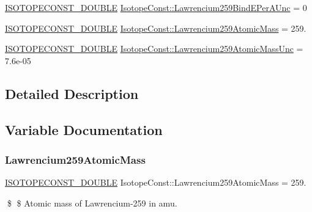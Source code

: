 \begin{DoxyCompactItemize}
\mbox{\hyperlink{group___isotope_const-_macros_ga8f45a7272ce02c0b4c65c44636ed719a}{I\+S\+O\+T\+O\+P\+E\+C\+O\+N\+S\+T\+\_\+\+D\+O\+U\+B\+LE}} \mbox{\hyperlink{group___isotope_const-_lawrencium-_lr259_gacc6e8c29899e626e9b82f533e239e230}{Isotope\+Const\+::\+Lawrencium259\+Bind\+E\+Per\+A\+Unc}} = 0
\item 
\mbox{\hyperlink{group___isotope_const-_macros_ga8f45a7272ce02c0b4c65c44636ed719a}{I\+S\+O\+T\+O\+P\+E\+C\+O\+N\+S\+T\+\_\+\+D\+O\+U\+B\+LE}} \mbox{\hyperlink{group___isotope_const-_lawrencium-_lr259_gac5b8604cb6c27d8d9e0642a94306ebd4}{Isotope\+Const\+::\+Lawrencium259\+Atomic\+Mass}} = 259.
\item 
\mbox{\hyperlink{group___isotope_const-_macros_ga8f45a7272ce02c0b4c65c44636ed719a}{I\+S\+O\+T\+O\+P\+E\+C\+O\+N\+S\+T\+\_\+\+D\+O\+U\+B\+LE}} \mbox{\hyperlink{group___isotope_const-_lawrencium-_lr259_gab9846c571936d0feba7493c67d3a691a}{Isotope\+Const\+::\+Lawrencium259\+Atomic\+Mass\+Unc}} = 7.\+6e-\/05
\end{DoxyCompactItemize}


\subsection{Detailed Description}


\subsection{Variable Documentation}
\mbox{\label{group___isotope_const-_lawrencium-_lr259_gac5b8604cb6c27d8d9e0642a94306ebd4}} 
\subsubsection{\texorpdfstring{Lawrencium259\+Atomic\+Mass}{Lawrencium259AtomicMass}}
{\footnotesize\ttfamily \mbox{\hyperlink{group___isotope_const-_macros_ga8f45a7272ce02c0b4c65c44636ed719a}{I\+S\+O\+T\+O\+P\+E\+C\+O\+N\+S\+T\+\_\+\+D\+O\+U\+B\+LE}} Isotope\+Const\+::\+Lawrencium259\+Atomic\+Mass = 259.}

\$ \$ Atomic mass of Lawrencium-\/259 in amu. \mbox{\label{group___isotope_const-_lawrencium-_lr259_gab9846c571936d0feba7493c67d3a691a}} 
